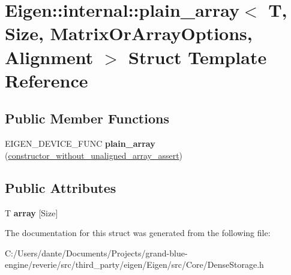 \hypertarget{struct_eigen_1_1internal_1_1plain__array}{}\section{Eigen\+::internal\+::plain\+\_\+array$<$ T, Size, Matrix\+Or\+Array\+Options, Alignment $>$ Struct Template Reference}
\label{struct_eigen_1_1internal_1_1plain__array}
\subsection*{Public Member Functions}
\begin{DoxyCompactItemize}
\item 
\mbox{\label{struct_eigen_1_1internal_1_1plain__array_a1c0042faeb6279d0bab4b890797e7e54}} 
E\+I\+G\+E\+N\+\_\+\+D\+E\+V\+I\+C\+E\+\_\+\+F\+U\+NC {\bfseries plain\+\_\+array} (\mbox{\hyperlink{struct_eigen_1_1internal_1_1constructor__without__unaligned__array__assert}{constructor\+\_\+without\+\_\+unaligned\+\_\+array\+\_\+assert}})
\end{DoxyCompactItemize}
\subsection*{Public Attributes}
\begin{DoxyCompactItemize}
\item 
\mbox{\label{struct_eigen_1_1internal_1_1plain__array_a7b573a8f091b34d0e81f6d70d8a7ff82}} 
T {\bfseries array} \mbox{[}Size\mbox{]}
\end{DoxyCompactItemize}


The documentation for this struct was generated from the following file\+:\begin{DoxyCompactItemize}
\item 
C\+:/\+Users/dante/\+Documents/\+Projects/grand-\/blue-\/engine/reverie/src/third\+\_\+party/eigen/\+Eigen/src/\+Core/Dense\+Storage.\+h\end{DoxyCompactItemize}
